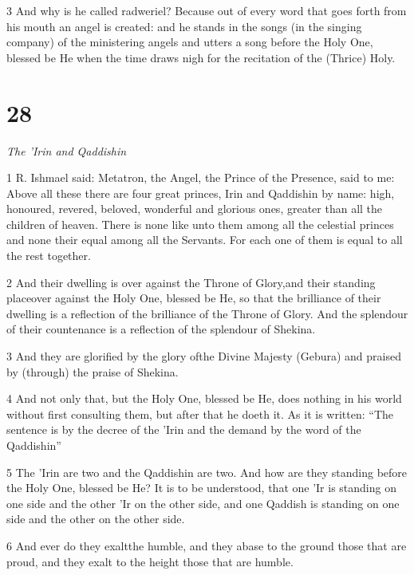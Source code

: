 \par 3 And why is he called radweriel? Because out of every word that goes forth from his mouth an angel is created: and he stands in the songs (in the singing company) of the ministering angels and utters a song before the Holy One, blessed be He when the time draws nigh for the recitation of the (Thrice) Holy. 

\chapter{28}

\par \textit{The 'Irin and Qaddishin}

\par 1 R. Ishmael said: Metatron, the Angel, the Prince of the Presence, said to me: Above all these there are four great princes, Irin and Qaddishin by name: high, honoured, revered, beloved, wonderful and glorious ones, greater than all the children of heaven. There is none like unto them among all the celestial princes and none their equal among all the Servants. For each one of them is equal to all the rest together. 

\par 2 And their dwelling is over against the Throne of Glory,and their standing placeover against the Holy One, blessed be He, so that the brilliance of their dwelling is a reflection of the brilliance of the Throne of Glory. And the splendour of their countenance is a reflection of the splendour of Shekina. 

\par 3 And they are glorified by the glory ofthe Divine Majesty (Gebura) and praised by (through) the praise of Shekina. 

\par 4 And not only that, but the Holy One, blessed be He, does nothing in his world without first consulting them, but after that he doeth it. As it is written: “The sentence is by the decree of the 'Irin and the demand by the word of the Qaddishin” 

\par 5 The 'Irin are two and the Qaddishin are two. And how are they standing before the Holy One, blessed be He? It is to be understood, that one 'Ir is standing on one side and the other 'Ir on the other side, and one Qaddish is standing on one side and the other on the other side. 

\par 6 And ever do they exaltthe humble, and they abase to the ground those that are proud, and they exalt to the height those that are humble. 

